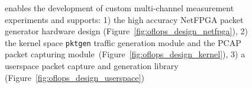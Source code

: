 \begin{figure}
\centering
{}
\label{fig:oflops_design}
\caption[\oflops architecture]{\oflops enables the development of
  custom multi-channel measurement experiments and supports: 1) the high accuracy
  NetFPGA packet generator hardware design
  (Figure~\ref{fig:oflops_design_netfpga}), 2) the kernel space {\tt pktgen}
  traffic generation module and the PCAP packet capturing
  module~(Figure~\ref{fig:oflops_design_kernel}), 3) a userspace packet capture
  and generation library (Figure~\ref{fig:oflops_design_userspace})} 
\end{figure}

